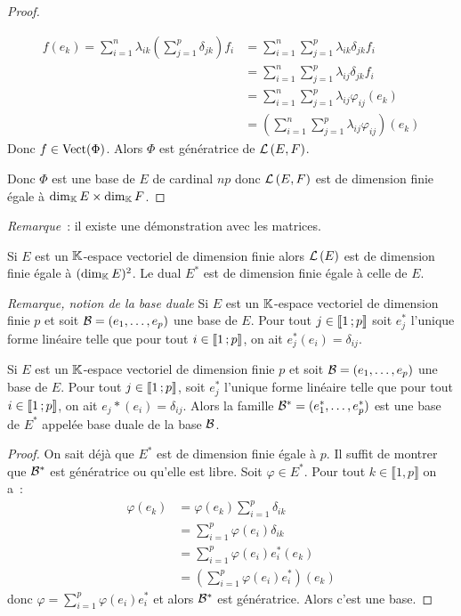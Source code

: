 \begin{proof}
\begin{enumerate}
\begin{align}
        f(e_k) = \sum_{i=1}^n \lambda_{ik} \left(\sum_{j=1}^p \delta_{jk}\right)
        f_i &= \sum_{i=1}^n \sum_{j=1}^p \lambda_{ik} \delta_{jk} f_i \\
        &=\sum_{i=1}^n \sum_{j=1}^p \lambda_{ij} \delta_{jk} f_i\\
        &=\sum_{i=1}^n \sum_{j=1}^p \lambda_{ij} \varphi_{ij}(e_k)\\
        &=\left(\sum_{i=1}^n \sum_{j=1}^p \lambda_{ij} \varphi_{ij}\right)(e_k)
      \end{align}
      Donc \(f \in \operatorname{Vect}(\Phi)\). Alors \(\Phi\) est génératrice de
      \(\mathcal{L}\left(E,F\right)\).
  \end{enumerate}
  Donc \(\Phi\) est une base de \(E\) de cardinal \(np\) donc \(\mathcal{L}\left(E,F\right)\) est
  de dimension finie égale à \(\operatorname{dim}_{\mathbb{K}} E \times \operatorname{dim}_{\mathbb{K}} F\).
\end{proof}

\emph{Remarque}~: il existe une démonstration avec les matrices.

\begin{corth}
  Si \(E\) est un \(\mathbb{K}\)-espace vectoriel de dimension finie alors \(\mathcal{L}\left(E\right)\)
  est de dimension finie égale à \((\operatorname{dim}_{\mathbb{K}} E)^2\). Le dual \(E^*\) est de
  dimension finie égale à celle de \(E\).
\end{corth}

\emph{Remarque, notion de la base duale} Si \(E\) est un \(\mathbb{K}\)-espace vectoriel
de dimension finie \(p\) et soit \(\mathcal{B}=(e_1, \ldots, e_p)\) une base de \(E\).
Pour tout \(j \in  \mathopen{\llbracket}1\mathclose{}\mathpunct{};p\mathclose{\rrbracket}\) soit \(e_j^*\) l'unique forme
linéaire telle que pour tout \(i \in  \mathopen{\llbracket}1\mathclose{}\mathpunct{};p\mathclose{\rrbracket}\), on ait
\(e_j^*(e_i)=\delta_{ij}\).

\begin{prop}
  Si \(E\) est un \(\mathbb{K}\)-espace vectoriel de dimension finie \(p\) et soit
  \(\mathcal{B}=(e_1, \ldots, e_p)\) une base de \(E\). Pour tout \(j \in
  \mathopen{\llbracket}1\mathclose{}\mathpunct{};p\mathclose{\rrbracket}\), soit \(e_j^*\) l'unique forme linéaire telle que
  pour tout \(i \in  \mathopen{\llbracket}1\mathclose{}\mathpunct{};p\mathclose{\rrbracket}\), on ait
  \(e_j*(e_i)=\delta_{ij}\). Alors la famille \(\mathcal{B}^* = (e_1^*, \ldots, e_p^*)\)
  est une base de \(E^*\) appelée base duale de la base \(\mathcal{B}\).
\end{prop}
\begin{proof}
  On sait déjà que \(E^*\) est de dimension finie égale à \(p\). Il suffit de
  montrer que \(\mathcal{B}^*\) est génératrice ou qu'elle est libre. Soit \(\varphi \in
  E^*\). Pour tout \(k \in \llbracket 1,p \rrbracket\) on a~:
  \begin{align}
    \varphi(e_k)&= \varphi(e_k) \sum_{i=1}^p \delta_{ik} \\
    &= \sum_{i=1}^p \varphi(e_i) \delta_{ik} \\ &=\sum_{i=1}^p \varphi(e_i)
    e_i^*(e_k)  \\
    &=\left(\sum_{i=1}^p \varphi(e_i) e_i^* \right)(e_k)
  \end{align}
  donc \(\varphi = \sum_{i=1}^p \varphi(e_i) e_i^*\) et alors \(\mathcal{B}^*\) est
  génératrice. Alors c'est une base.
\end{proof}


